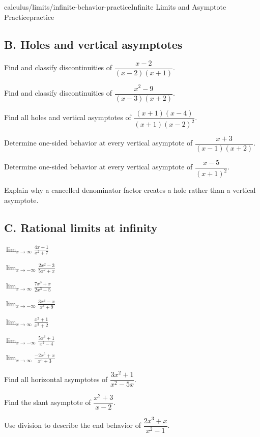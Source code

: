 \documentclass[11pt,openany]{book}
\theoremstyle{bgplain}
\begin{document}
\begin{webpage}{calculus/limits/infinite-behavior-practice}{Infinite Limits and Asymptote Practice}{practice}
\subsection*{B. Holes and vertical asymptotes}
\begin{bgexercises}[label=\textbf{4.\arabic*},resume]
  \item Find and classify discontinuities of \(\dfrac{x-2}{(x-2)(x+1)}\).
  \item Find and classify discontinuities of \(\dfrac{x^2-9}{(x-3)(x+2)}\).
  \item Find all holes and vertical asymptotes of \(\dfrac{(x+1)(x-4)}{(x+1)(x-2)^2}\).
  \item Determine one-sided behavior at every vertical asymptote of \(\dfrac{x+3}{(x-1)(x+2)}\).
  \item Determine one-sided behavior at every vertical asymptote of \(\dfrac{x-5}{(x+1)^2}\).
  \item Explain why a cancelled denominator factor creates a hole rather than a vertical asymptote.
\end{bgexercises}

\subsection*{C. Rational limits at infinity}
\begin{bgexercises}[label=\textbf{4.\arabic*},resume]
  \item \(\displaystyle\lim_{x\to\infty}\frac{4x+1}{x^2+7}\)
  \item \(\displaystyle\lim_{x\to-\infty}\frac{2x^2-3}{5x^2+x}\)
  \item \(\displaystyle\lim_{x\to\infty}\frac{7x^3+x}{2x^3-5}\)
  \item \(\displaystyle\lim_{x\to-\infty}\frac{3x^4-x}{x^4+9}\)
  \item \(\displaystyle\lim_{x\to\infty}\frac{x^2+1}{x^3+2}\)
  \item \(\displaystyle\lim_{x\to-\infty}\frac{5x^3+1}{x^2-4}\)
  \item \(\displaystyle\lim_{x\to\infty}\frac{-2x^5+x}{x^5+3}\)
  \item Find all horizontal asymptotes of \(\dfrac{3x^2+1}{x^2-5x}\).
  \item Find the slant asymptote of \(\dfrac{x^2+3}{x-2}\).
  \item Use division to describe the end behavior of \(\dfrac{2x^3+x}{x^2-1}\).
\end{bgexercises}


\end{webpage}
\end{document}

